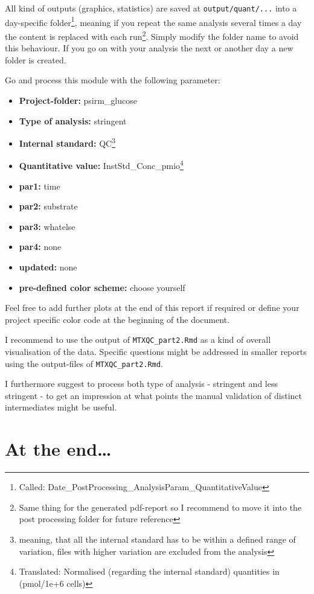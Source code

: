 \documentclass[]{book}
\providecommand{\tightlist}{%
  \setlength{\itemsep}{0pt}\setlength{\parskip}{0pt}}
\let\rmarkdownfootnote\footnote%
\def\footnote{\protect\rmarkdownfootnote}
\begin{document}
All kind of outputs (graphics, statistics) are saved at \texttt{output/quant/...} into a day-specific folder\footnote{Called: Date\_PostProcessing\_AnalysisParam\_QuantitativeValue}, meaning if you repeat the same analysis several times a day the content is replaced with each run\footnote{Same thing for the generated pdf-report so I recommend to move it into the post processing folder for future reference}. Simply modify the folder name to avoid this behaviour. If you go on with your analysis the next or another day a new folder is created.

Go and process this module with the following parameter:

\begin{itemize}
\tightlist
\item
  \textbf{Project-folder:} psirm\_glucose
\item
  \textbf{Type of analysis:} stringent
\item
  \textbf{Internal standard:} QC\footnote{meaning, that all the internal standard has to be within a defined range of variation, files with higher variation are excluded from the analysis}
\item
  \textbf{Quantitative value:} InstStd\_Conc\_pmio\footnote{Translated: Normalised (regarding the internal standard) quantities in (pmol/1e+6 cells)}
\item
  \textbf{par1:} time
\item
  \textbf{par2:} substrate
\item
  \textbf{par3:} whatelse
\item
  \textbf{par4:} none
\item
  \textbf{updated:} none
\item
  \textbf{pre-defined color scheme:} choose yourself
\end{itemize}

Feel free to add further plots at the end of this report if required or define your project specific color code at the beginning of the document.

I recommend to use the output of \texttt{MTXQC\_part2.Rmd} as a kind of overall visualisation of the data. Specific questions might be addressed in smaller reports using the output-files of \texttt{MTXQC\_part2.Rmd}.

I furthermore suggest to process both type of analysis - stringent and less stringent - to get an impression at what points the manual validation of distinct intermediates might be useful.

\hypertarget{at-the-end}{%
\section{At the end\ldots{}}\label{at-the-end}}
\end{document}
